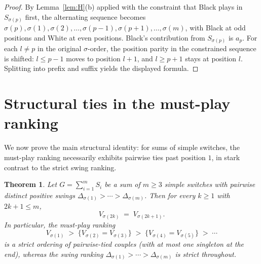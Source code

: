 \documentclass[11pt,a4paper]{amsart}
\newtheorem{theorem}{Theorem}[section]
\theoremstyle{definition}
\theoremstyle{remark}
\begin{document}
\begin{proof}
By Lemma~\ref{lem:H}(b) applied with the constraint that Black plays in
$S_{\sigma(p)}$ first, the alternating sequence becomes
$\sigma(p), \sigma(1), \sigma(2), \ldots, \sigma(p-1), \sigma(p+1),
\ldots, \sigma(m)$, with Black at odd positions and White at even
positions. Black's contribution from $S_{\sigma(p)}$ is $a_p$. For each
$l \neq p$ in the original $\sigma$-order, the position parity in the
constrained sequence is shifted: $l \leq p-1$ moves to position $l+1$,
and $l \geq p+1$ stays at position $l$. Splitting into prefix and suffix
yields the displayed formula.
\end{proof}

\section{Structural ties in the must-play ranking}\label{sec:F2}

We now prove the main structural identity: for sums of simple switches,
the must-play ranking necessarily exhibits pairwise ties past position
$1$, in stark contrast to the strict swing ranking.

\begin{theorem}\label{thm:F2}
Let $G = \sum_{i=1}^m S_i$ be a sum of $m \geq 3$ simple switches with
pairwise distinct positive swings $\Delta_{\sigma(1)} > \cdots >
\Delta_{\sigma(m)}$. Then for every $k \geq 1$ with $2k+1 \leq m$,
\[
  V_{\sigma(2k)} \;=\; V_{\sigma(2k+1)}.
\]
In particular, the must-play ranking
\[
  V_{\sigma(1)} \;>\;
  \{V_{\sigma(2)} = V_{\sigma(3)}\} \;>\;
  \{V_{\sigma(4)} = V_{\sigma(5)}\} \;>\; \cdots
\]
is a strict ordering of pairwise-tied couples (with at most one singleton
at the end), whereas the swing ranking $\Delta_{\sigma(1)} > \cdots >
\Delta_{\sigma(m)}$ is strict throughout.
\end{theorem}
\end{document}
